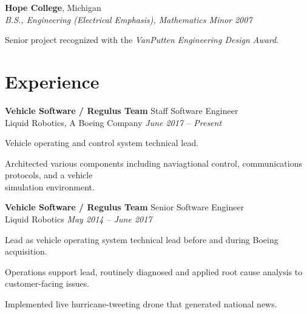 \documentclass[article]{resume}
\begin{document}
\textbf{Hope College}, Michigan\\
\textsl{B.S., Engineering (Electrical Emphasis), Mathematics Minor} \hfill \textsl{2007}\\\vspace{ -2 mm}
    \begin{list2}
        \item Senior project recognized with the \textit{VanPutten Engineering Design Award}.
    \end{list2}
    \vspace{ -2 mm}
    \section{Experience}
\vspace*{0.5\baselineskip}
    \textbf{Vehicle Software / Regulus Team} \hfill Staff Software Engineer\\  
    Liquid Robotics, A Boeing Company \hfill \textsl{June 2017 -- Present} \\
    \vspace{ -2 mm}
    \begin{list2}
        \item Vehicle operating and control system technical lead.
        \item Architected various components including naviagtional control, communications protocols, and a vehicle \\ simulation environment.
    \end{list2}\vspace{-2mm}

    \textbf{Vehicle Software / Regulus Team} \hfill Senior Software Engineer\\  
    Liquid Robotics \hfill \textsl{May 2014 -- June 2017} \\
    \vspace{ -2 mm}
    \begin{list2}
        \item Lead as vehicle operating system technical lead before and during Boeing acquisition.
        \item Operations support lead, routinely diagnosed and applied root cause analysis to customer-facing issues.
        \item Implemented live hurricane-tweeting drone that generated national news.
    \end{list2}\vspace{-2mm}
\end{document}
